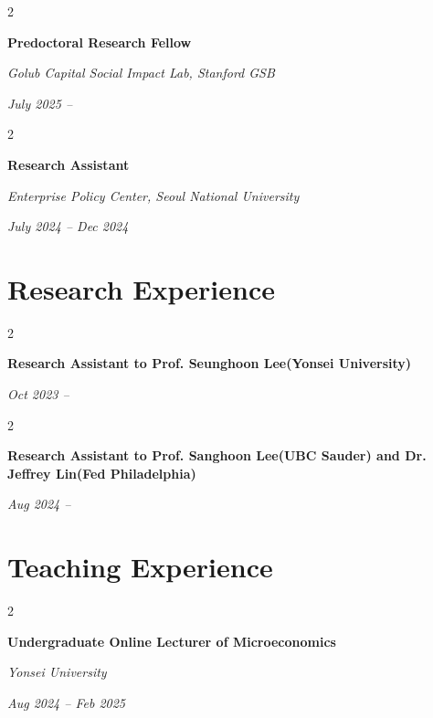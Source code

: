 \documentclass[10pt, letterpaper]{article}
\newenvironment{twocolentry}[2][]{
	\onecolentry
	\def\secondColumn{#2}
	\setcolumnwidth{\fill, 4.5 cm}
	\begin{paracol}{2}
	}{
		\switchcolumn \raggedleft \secondColumn
	\end{paracol}
	\endonecolentry
} %
\begin{document}
			\begin{twocolentry}{
			\textit{July 2025 –}    
			
			\textit{}}
		\textbf{Predoctoral Research Fellow}
		
		\textit{Golub Capital Social Impact Lab, Stanford GSB}
	\end{twocolentry}
	
	\vspace{0.20cm}
		\begin{twocolentry}{
			\textit{July 2024 – Dec 2024}    
			
			\textit{}}
		\textbf{Research Assistant}
		
		\textit{Enterprise Policy Center, Seoul National University}
	\end{twocolentry}
	
	
	
	\vspace{12pt}
	
	\section{Research Experience}
	
			\begin{twocolentry}{
			\textit{Oct 2023 –}    }
		\textbf{Research Assistant to Prof. Seunghoon Lee(Yonsei University)}
		
	\end{twocolentry}
	
\vspace{12pt}
				\begin{twocolentry}{
			\textit{Aug 2024 –}    
			}
		\textbf{Research Assistant to Prof. Sanghoon Lee(UBC Sauder) and Dr. Jeffrey Lin(Fed Philadelphia)}
		
	\end{twocolentry}
	
\vspace{12pt}

	
	
	
	\section{Teaching Experience}
		\begin{twocolentry}{
			\textit{Aug 2024 – Feb 2025}    
			
			\textit{}}
		\textbf{Undergraduate Online Lecturer of Microeconomics}
		
		\textit{Yonsei University}
	\end{twocolentry}
	
\end{document}
